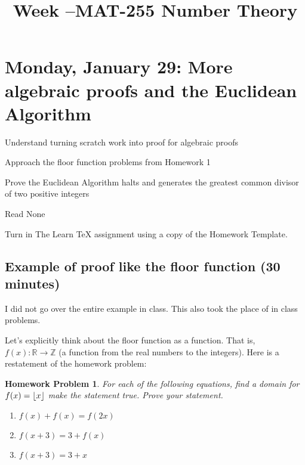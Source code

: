 \documentclass{ximera}
\title{Week \week--MAT-255 Number Theory}
\newtheorem*{prob}{Homework Problem}
\begin{document}
\section{Monday, January 29: More algebraic proofs and the Euclidean Algorithm}

\begin{obj}
\item  Understand turning scratch work into proof for algebraic proofs
\item  Approach the floor function problems from Homework 1
\item Prove the Euclidean Algorithm halts and generates the greatest common divisor of two positive integers
\end{obj}

\begin{pre}
 \item[Read] None 
 \item[Turn in] The Learn TeX assignment using a copy of the Homework Template.
\end{pre}
\subsection{Example of proof like the floor function (30 minutes)}
I did not go over the entire example in class. This also took the place of in class problems.

Let's explicitly think about the floor function as a function. That is, $f(x):\mathbb{R}\to\mathbb{Z}$ (a function from the real numbers to the integers). Here is a restatement of the homework problem:

\begin{prob}
For each of the following equations, find a domain for $f(x)=\left\lfloor  x \right\rfloor$ make the statement true. Prove your statement. 
	\begin{enumerate}
 		\item $f( x ) + f( x ) =f( 2x)$
		\item $f( x + 3 )  = 3 +f( x)$
		\item $f( x +3 ) = 	3 + x$
	\end{enumerate} 
\end{prob}
\end{document}
